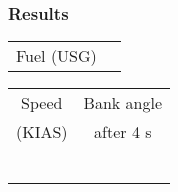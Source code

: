 % 
% 
%
\Large
\subsubsection*{Results}
  \begin{tabular}{p{2 cm}|p{2 cm}|}
  \cline{2-2}
  Fuel (USG)&\\
  \cline{2-2}
  \end{tabular}
\vspace{0.2 in}

  \begin{tabular}{|c|c|}
  \hline
  Speed&Bank angle\\
  (KIAS)&after 4 s\\
  \hline
  \hline
  &\\
  \hline
  &\\
  \hline
  &\\
  \hline
  &\\
  \hline
  &\\
  \hline
  &\\
  \hline
  \end{tabular}
  \normalsize
  
  